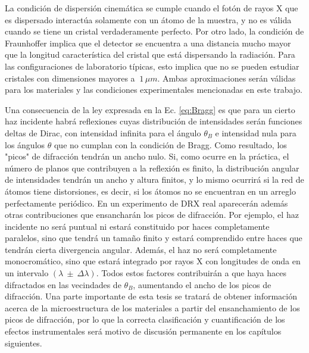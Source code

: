 La condición de dispersión cinemática se cumple cuando el fotón de rayos X que es dispersado interactúa solamente con un átomo de la muestra, y no es válida cuando se tiene un cristal verdaderamente perfecto.
Por otro lado, la condición de Fraunhoffer implica que el detector se encuentra a una distancia mucho mayor que la longitud característica del cristal que está dispersando la radiación.
Para las configuraciones de laboratorio típicas, esto implica que no se pueden estudiar cristales con dimensiones mayores a $~1\,\mu m$.
Ambas aproximaciones serán válidas para los materiales y las condiciones experimentales mencionadas en este trabajo.


Una consecuencia de la ley expresada en la Ec. \ref{eq:Bragg} es que para un cierto haz incidente habrá reflexiones cuyas distribución de intensidades serán funciones deltas de Dirac, con intensidad infinita para el ángulo $\theta_{B}$ e intensidad nula para los ángulos $\theta$ que no cumplan con la condición de Bragg. Como resultado, los "picos" de difracción tendrán un ancho nulo. 
Si, como ocurre en la práctica, el número de planos que contribuyen a la reflexión es finito, la distribución angular de intensidades tendrán un ancho y altura finitos, y lo mismo ocurrirá si la red de átomos tiene distorsiones, es decir, si los átomos no se encuentran en un arreglo perfectamente periódico. 
En un experimento de DRX real aparecerán además otras contribuciones que ensancharán los picos de difracción. 
Por ejemplo, el haz incidente no será puntual ni estará constituido por haces completamente paralelos, sino que tendrá un tamaño finito y estará comprendido entre haces que tendrán cierta divergencia angular.
Además, el haz no será completamente monocromático, sino que estará integrado por rayos X con longitudes de onda en un intervalo $(\lambda \ \pm \ \Delta \lambda)$. 
Todos estos factores contribuirán a que haya haces difractados en las vecindades de $\theta_{B}$, aumentando el ancho de los picos de difracción. Una parte importante de esta tesis se tratará de obtener información acerca de la microestructura de los materiales a partir del ensanchamiento de los picos de difracción, por lo que la correcta clasificación y cuantificación de los efectos instrumentales será motivo de discusión permanente en los capítulos siguientes.

